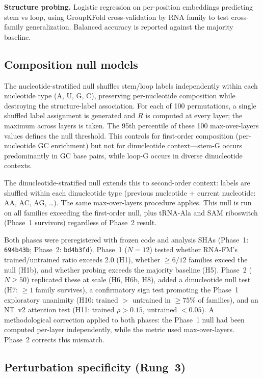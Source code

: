 \documentclass[11pt]{article}
\begin{document}
\textbf{Structure probing.}  Logistic regression on per-position
embeddings predicting stem vs loop, using GroupKFold cross-validation
by RNA family to test cross-family generalization.  Balanced accuracy
is reported against the majority baseline.

\subsection{Composition null models}
\label{sec:nulls}

The nucleotide-stratified null shuffles stem/loop labels independently
within each nucleotide type (A, U, G, C), preserving per-nucleotide
composition while destroying the structure-label association.  For
each of 100 permutations, a single shuffled label assignment is
generated and $R$ is computed at every layer; the maximum across
layers is taken.  The 95th percentile of these 100 max-over-layers
values defines the null threshold.  This controls for first-order
composition (per-nucleotide GC enrichment) but not for dinucleotide
context---stem-G occurs predominantly in GC base pairs, while loop-G
occurs in diverse dinucleotide contexts.

The dinucleotide-stratified null extends this to second-order context:
labels are shuffled within each dinucleotide type (previous nucleotide
+ current nucleotide: AA, AC, AG, \ldots).  The same max-over-layers
procedure applies.  This null is run on all families exceeding the
first-order null, plus tRNA-Ala and SAM riboswitch (Phase~1 survivors)
regardless of Phase~2 result.

Both phases were preregistered with frozen code and analysis SHAs
(Phase~1: \texttt{694b43b}; Phase~2: \texttt{bd4b3fd}).  Phase~1
($N = 12$) tested whether RNA-FM's trained/untrained ratio exceeds
2.0 (H1), whether $\geq 6/12$ families exceed the null (H1b), and
whether probing exceeds the majority baseline (H5).  Phase~2
($N \geq 50$) replicated these at scale (H6, H6b, H8), added a
dinucleotide null test (H7: $\geq 1$ family survives), a confirmatory
sign test promoting the Phase~1 exploratory unanimity (H10: trained
$>$ untrained in $\geq 75\%$ of families), and an NT~v2 attention
test (H11: trained $\rho > 0.15$, untrained $< 0.05$).  A
methodological correction applied to both phases: the Phase~1 null
had been computed per-layer independently, while the metric used
max-over-layers.  Phase~2 corrects this mismatch.


\subsection{Perturbation specificity (Rung~3)}
\label{sec:rung3_methods}
\end{document}
